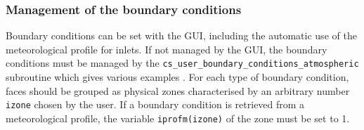 {%
\subsubsection{Management of the boundary conditions}

Boundary conditions can be set with the GUI, including the automatic use of the meteorological 
profile for inlets.
If not managed by the GUI, the boundary conditions must be managed by the \texttt{cs\_user\_boundary\_conditions\_atmospheric} subroutine
which gives various examples . For each type of boundary condition, faces should be grouped as physical zones characterised 
by an arbitrary number \texttt{izone} chosen by the user. If a boundary condition is retrieved from a meteorological profile,
 the variable \texttt{iprofm(izone)} of the zone must be set to 1.







}
